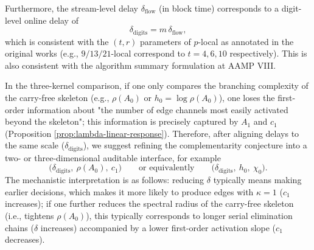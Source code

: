 Furthermore, the stream-level delay $\delta_{\mathrm{flow}}$ (in block time) corresponds to a digit-level online delay of
\[
\delta_{\mathrm{digits}}=m\,\delta_{\mathrm{flow}},
\]
which is consistent with the $(t,r)$ parameters of $p$-local as annotated in the original works (e.g., $9/13/21$-local correspond to $t=4,6,10$ respectively). \cite{FrougnyHellerPelantovaSvobodovaParallelAlgorithmsSlides,Frougny2012NumbersAsStreamsLeiden}
This is also consistent with the algorithm summary formulation at AAMP VIII. \cite{SvobodovaAAMPVIIIParallelAddition}

\begin{remark}\label{rem:entropy-delay-complement-c1}
In the three-kernel comparison, if one only compares the branching complexity of the carry-free skeleton (e.g., \(\rho(A_0)\) or \(h_0=\log\rho(A_0)\)), one loses the first-order information about "the number of edge channels most easily activated beyond the skeleton"; this information is precisely captured by \(A_1\) and \(c_1\) (Proposition \ref{prop:lambda-linear-response}).
Therefore, after aligning delays to the same scale (\(\delta_{\mathrm{digits}}\)), we suggest refining the complementarity conjecture into a two- or three-dimensional auditable interface, for example
$$
\bigl(\delta_{\mathrm{digits}},\ \rho(A_0),\ c_1\bigr)
\qquad\text{or equivalently}\qquad
\bigl(\delta_{\mathrm{digits}},\ h_0,\ \chi_0\bigr).
$$
The mechanistic interpretation is as follows: reducing \(\delta\) typically means making earlier decisions, which makes it more likely to produce edges with \(\kappa=1\) (\(c_1\) increases); if one further reduces the spectral radius of the carry-free skeleton (i.e., tightens \(\rho(A_0)\)), this typically corresponds to longer serial elimination chains (\(\delta\) increases) accompanied by a lower first-order activation slope (\(c_1\) decreases).
\end{remark}



